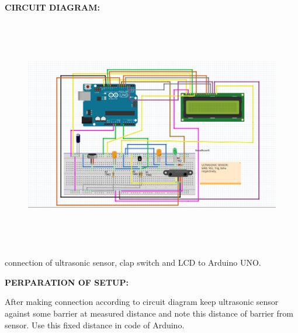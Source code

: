 \documentclass[12pt]{article}
\begin{document}
\vspace{\baselineskip}
{\fontsize{14pt}{16.8pt}\selectfont \textbf{CIRCUIT DIAGRAM:}\par}\par

\vspace{\baselineskip}

\begin{figure}[H]
\advance\leftskip -0.53in	\includegraphics[width=6.5in,height=4.0in]{./media/image2.png}
\end{figure}


{\fontsize{14pt}{16.8pt}\selectfont connection of ultrasonic sensor, clap switch and LCD to Arduino UNO. \tabto{5.98in} \par}\par

\vspace{\baselineskip}
\vspace{\baselineskip}

\vspace{\baselineskip}
{\fontsize{14pt}{16.8pt}\selectfont \textbf{PERPARATION OF SETUP:}\par}\par

\vspace{\baselineskip}
{\fontsize{14pt}{16.8pt}\selectfont After making connection according to circuit diagram keep ultrasonic sensor against some barrier at measured distance and note this distance of barrier from sensor. Use this fixed distance in code of Arduino.\par}\par
\end{document}
